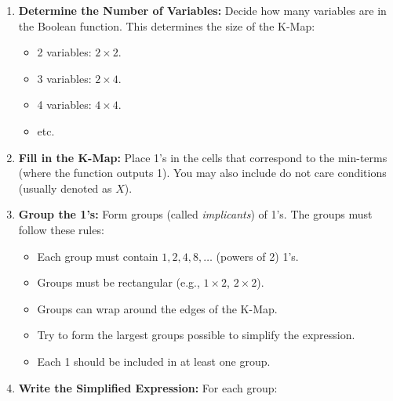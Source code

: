 \begin{enumerate}

	\item \textbf{Determine the Number of Variables:} Decide how many variables are in the
	      Boolean function. This determines the size of the K-Map:

	      \begin{itemize}

		      \item 2 variables: \(2 \times 2\).

		      \item 3 variables: \(2 \times 4\).

		      \item 4 variables: \(4 \times 4\).

		      \item etc.

	      \end{itemize}

	\item \textbf{Fill in the K-Map:} Place 1's in the cells that correspond to the min-terms
	      (where the function outputs 1). You may also include do not care conditions
	      (usually denoted as \(X\)).

	\item \textbf{Group the 1's:} Form groups (called \emph{implicants}) of 1's.
	      The groups must follow these rules:

	      \begin{itemize}

		      \item Each group must contain \(1, 2, 4, 8, \ldots\) (powers of 2) 1's.

		      \item Groups must be rectangular (e.g., \(1 \times 2\), \(2 \times 2\)).

		      \item Groups can wrap around the edges of the K-Map.

		      \item Try to form the largest groups possible to simplify the expression.

		      \item Each 1 should be included in at least one group.

	      \end{itemize}

	\item \textbf{Write the Simplified Expression:} For each group:


\end{enumerate}
